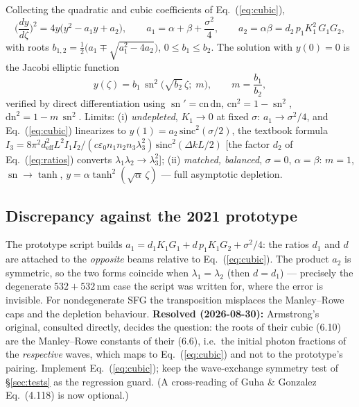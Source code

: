 \documentclass[aps,pra,preprint,amsmath,amssymb,nofootinbib,superscriptaddress]{revtex4-2}
\newcommand{\deff}{d_{\mathrm{eff}}}
\newcommand{\sn}{\operatorname{sn}}
\newcommand{\flag}[1]{\textcolor{red!70!black}{\textbf{#1}}}
\begin{document}
Collecting the quadratic and cubic coefficients of
Eq.~(\ref{eq:cubic}),
\begin{equation}
\Big(\frac{dy}{d\zeta}\Big)^{2}=4y\big(y^2-a_1y+a_2\big),\qquad
a_1=\alpha+\beta+\frac{\sigma^{2}}{4},\qquad
a_2=\alpha\beta=d_2\,p_1K_1^{2}\,G_1G_2 ,
\label{eq:a1a2}
\end{equation}
with roots $b_{1,2}=\tfrac12\big(a_1\mp\sqrt{a_1^{2}-4a_2}\big)$,
$0\le b_1\le b_2$. The solution with $y(0)=0$ is the Jacobi elliptic
function
\begin{equation}
y(\zeta)=b_1\,\sn^{2}\!\big(\sqrt{b_2}\,\zeta;\;m\big),
\qquad m=\frac{b_1}{b_2},
\label{eq:sn}
\end{equation}
verified by direct differentiation using
$\sn'=\mathrm{cn}\,\mathrm{dn}$, $\mathrm{cn}^2=1-\sn^2$,
$\mathrm{dn}^2=1-m\,\sn^2$. Limits:
(i) \emph{undepleted}, $K_1\to0$ at fixed $\sigma$:
$a_1\to\sigma^{2}/4$, and Eq.~(\ref{eq:cubic}) linearizes to
$y(1)=a_2\,\mathrm{sinc}^{2}(\sigma/2)$, the textbook formula
$I_3=8\pi^2\deff^2L^2I_1I_2/(c\varepsilon_0 n_1n_2n_3\lambda_3^{2})
\,\mathrm{sinc}^{2}(\Delta kL/2)$
[the factor $d_2$ of Eq.~(\ref{eq:ratios}) converts
$\lambda_1\lambda_2\to\lambda_3^2$];
(ii) \emph{matched, balanced}, $\sigma=0$, $\alpha=\beta$: $m=1$,
$\sn\to\tanh$, $y=\alpha\tanh^{2}(\sqrt{\alpha}\,\zeta)$ --- full
asymptotic depletion.

\subsection{Discrepancy against the 2021 prototype}\label{sec:flag}

The prototype script builds
$a_1 = d_1 K_1 G_1 + d\,p_1 K_1 G_2 + \sigma^2/4$: the ratios $d_1$ and $d$
are attached to the \emph{opposite} beams relative to
Eq.~(\ref{eq:cubic}). The product $a_2$ is symmetric, so the two forms
coincide when $\lambda_1=\lambda_2$ (then $d=d_1$) --- precisely the
degenerate $532+532\,$nm case the script was written for, where the error
is invisible. For nondegenerate SFG the transposition misplaces the
Manley--Rowe caps and the depletion behaviour.
\flag{Resolved (2026-08-30):} Armstrong's original, consulted directly,
decides the question: the roots of their cubic (6.10) are the Manley--Rowe
constants of their (6.6), i.e.\ the initial photon fractions of the
\emph{respective} waves, which maps to Eq.~(\ref{eq:cubic}) and not to the
prototype's pairing. Implement Eq.~(\ref{eq:cubic}); keep the
wave-exchange symmetry test of \S\ref{sec:tests} as the regression guard.
(A cross-reading of Guha \& Gonzalez Eq.~(4.118) is now optional.)
\end{document}
